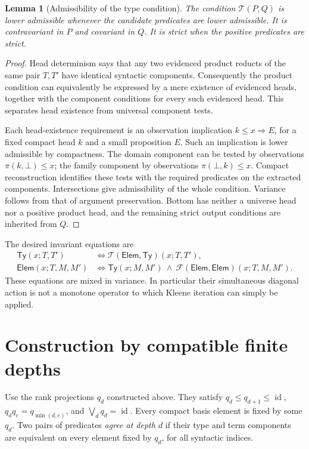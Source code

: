 \documentclass[11pt,a4paper]{article}
\newtheorem{lemma}[theorem]{Lemma}
\theoremstyle{definition}
\theoremstyle{remark}
\newcommand{\lub}{\bigvee}
\newcommand{\TyRel}{\mathsf{Ty}}
\newcommand{\ElemRel}{\mathsf{Elem}}
\begin{document}
\begin{lemma}[Admissibility of the type condition]\label{lem:type-admissible}
The condition $\mathcal T(P,Q)$ is lower admissible whenever the
candidate predicates are lower admissible. It is contravariant in $P$
and covariant in $Q$. It is strict when the positive predicates are strict.
\end{lemma}
\begin{proof}
Head determinism says that any two evidenced product reducts of the same
pair $T,T'$ have identical syntactic components. Consequently the product
condition can equivalently be expressed by a mere existence of evidenced
heads, together with the component conditions for every such evidenced
head. This separates head existence from universal component tests.

Each head-existence requirement is an observation implication
$k\leq x\Longrightarrow E$, for a fixed compact head $k$ and a small
proposition $E$. Such an implication is lower admissible by compactness.
The domain component can be tested by observations $\pi(k,\bot)\leq x$;
the family component by observations $\pi(\bot,k)\leq x$. Compact
reconstruction identifies these tests with the required predicates on
the extracted components. Intersections give admissibility of the whole
condition. Variance follows from that of argument preservation. Bottom
has neither a universe head nor a positive product head, and the
remaining strict output conditions are inherited from $Q$.
\end{proof}

The desired invariant equations are
\begin{equation}\label{eq:relation-equations}
\begin{aligned}
 \TyRel(x;T,T')
  &\Longleftrightarrow\mathcal T(\ElemRel,\TyRel)(x;T,T'),\\
 \ElemRel(x;T,M,M')
  &\Longleftrightarrow\TyRel(x;M,M')\ \wedge\
    \mathcal F(\ElemRel,\ElemRel)(x;T,M,M').
\end{aligned}
\end{equation}
These equations are mixed in variance. In particular their simultaneous
diagonal action is not a monotone operator to which Kleene iteration
can simply be applied.

\section{Construction by compatible finite depths}

Use the rank projections $q_d$ constructed above. They satisfy
$q_d\leq q_{d+1}\leq\operatorname{id}$,
$q_dq_e=q_{\min(d,e)}$, and $\lub_dq_d=\operatorname{id}$.
Every compact basis element is fixed by some $q_d$.
Two pairs of predicates \emph{agree at depth $d$} if their type and term
components are equivalent on every element fixed by $q_d$, for all
syntactic indices.
\end{document}
